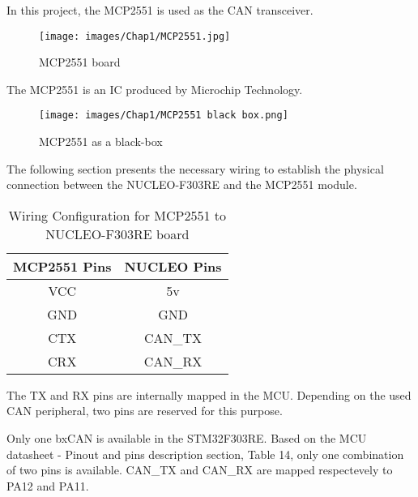 In this project, the MCP2551 is used as the CAN transceiver. \cite{R22}

\begin{figure}[H]
\begin{center}
\texttt{[image: images/Chap1/MCP2551.jpg]}\\
\caption{MCP2551 board}
\label{MCP2551 photo}
\end{center}
\end{figure} 

The MCP2551 is an IC produced by Microchip Technology.

\begin{figure}[H]
\begin{center}
\texttt{[image: images/Chap1/MCP2551 black box.png]}\\
\caption{MCP2551 as a black-box}
\label{MCP2551 blackbox}
\end{center}
\end{figure} 

The following section presents the necessary wiring to establish the physical connection between the NUCLEO-F303RE and the MCP2551 module.

\begin{table} [H]
\centering
\begin{tabular}{| c | c |} 
 \hline
 MCP2551 Pins & NUCLEO Pins \\ [0.5ex] %
 \hline\hline
 VCC &  5v       \\ 
 \hline
 GND &  GND     \\ %
 \hline
 CTX & CAN\_TX  \\
 \hline
 CRX & CAN\_RX   \\
 \hline
\end{tabular}
    \caption{Wiring Configuration for MCP2551 to NUCLEO-F303RE board}
    \label{STM32 MCP2551 wiring}
\end{table}


The TX and RX pins are internally mapped in the MCU. Depending on the used CAN peripheral, two pins are reserved for this purpose.

Only one bxCAN is available in the STM32F303RE. Based on the MCU datasheet - Pinout and pins description section, Table 14, only one combination of two pins is available. CAN\_TX and CAN\_RX are mapped respectevely to PA12 and PA11. %

